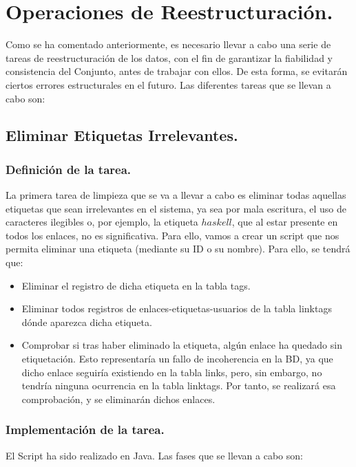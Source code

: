 \section{Operaciones de Reestructuración.}

Como se ha comentado anteriormente, es necesario llevar a cabo una serie de tareas de reestructuración de los datos, con el fin de garantizar la fiabilidad y consistencia del Conjunto, antes de trabajar con ellos. De esta forma, se evitarán ciertos errores estructurales en el futuro. Las diferentes tareas que se llevan a cabo son:

\subsection{Eliminar Etiquetas Irrelevantes.}

\subsubsection{Definición de la tarea.}

La primera tarea de limpieza que se va a llevar a cabo es eliminar todas aquellas etiquetas que sean irrelevantes en el sistema, ya sea por mala escritura, el uso de caracteres ilegibles o, por ejemplo, la etiqueta $haskell$, que al estar presente en todos los enlaces, no es significativa. Para ello, vamos a crear un script que nos permita eliminar una etiqueta (mediante su ID o su nombre). Para ello, se tendrá que:
\begin{itemize}
\item    Eliminar el registro de dicha etiqueta en la tabla tags.
\item    Eliminar todos registros de enlaces-etiquetas-usuarios de la tabla linktags dónde aparezca dicha etiqueta.
\item    Comprobar si tras haber eliminado la etiqueta, algún enlace ha quedado sin etiquetación. Esto representaría un fallo de incoherencia en la BD, ya que dicho enlace seguiría existiendo en la tabla links, pero, sin embargo, no tendría ninguna ocurrencia en la tabla linktags. Por tanto, se realizará esa comprobación, y se eliminarán dichos enlaces.
\end{itemize}

\subsubsection{Implementación de la tarea.}

El Script ha sido realizado en Java. Las fases que se llevan a cabo son:

